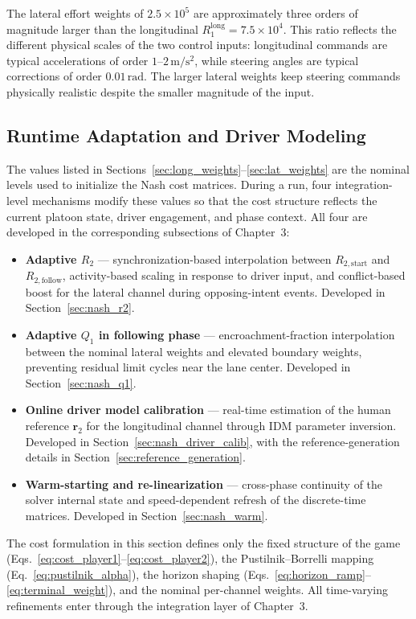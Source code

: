 \documentclass[12pt,a4paper,oneside]{report}
\begin{document}
The lateral effort weights of $2.5 \times 10^5$ are approximately three orders of magnitude larger than the longitudinal $R_1^{\text{long}} = 7.5 \times 10^4$. This ratio reflects the different physical scales of the two control inputs: longitudinal commands are typical accelerations of order $1$--$2\,\mathrm{m/s^2}$, while steering angles are typical corrections of order $0.01\,\mathrm{rad}$. The larger lateral weights keep steering commands physically realistic despite the smaller magnitude of the input.

\subsection{Runtime Adaptation and Driver Modeling}
\label{sec:cost_runtime}

The values listed in Sections~\ref{sec:long_weights}--\ref{sec:lat_weights} are the nominal levels used to initialize the Nash cost matrices. During a run, four integration-level mechanisms modify these values so that the cost structure reflects the current platoon state, driver engagement, and phase context. All four are developed in the corresponding subsections of Chapter~3:
\begin{itemize}
\item \textbf{Adaptive $R_2$} — synchronization-based interpolation between $R_{2,\text{start}}$ and $R_{2,\text{follow}}$, activity-based scaling in response to driver input, and conflict-based boost for the lateral channel during opposing-intent events. Developed in Section~\ref{sec:nash_r2}.
\item \textbf{Adaptive $Q_1$ in following phase} — encroachment-fraction interpolation between the nominal lateral weights and elevated boundary weights, preventing residual limit cycles near the lane center. Developed in Section~\ref{sec:nash_q1}.
\item \textbf{Online driver model calibration} — real-time estimation of the human reference $\mathbf{r}_2$ for the longitudinal channel through IDM parameter inversion. Developed in Section~\ref{sec:nash_driver_calib}, with the reference-generation details in Section~\ref{sec:reference_generation}.
\item \textbf{Warm-starting and re-linearization} — cross-phase continuity of the solver internal state and speed-dependent refresh of the discrete-time matrices. Developed in Section~\ref{sec:nash_warm}.
\end{itemize}

The cost formulation in this section defines only the fixed structure of the game (Eqs.~\eqref{eq:cost_player1}--\eqref{eq:cost_player2}), the Pustilnik--Borrelli mapping (Eq.~\eqref{eq:pustilnik_alpha}), the horizon shaping (Eqs.~\eqref{eq:horizon_ramp}--\eqref{eq:terminal_weight}), and the nominal per-channel weights. All time-varying refinements enter through the integration layer of Chapter~3.
\end{document}
